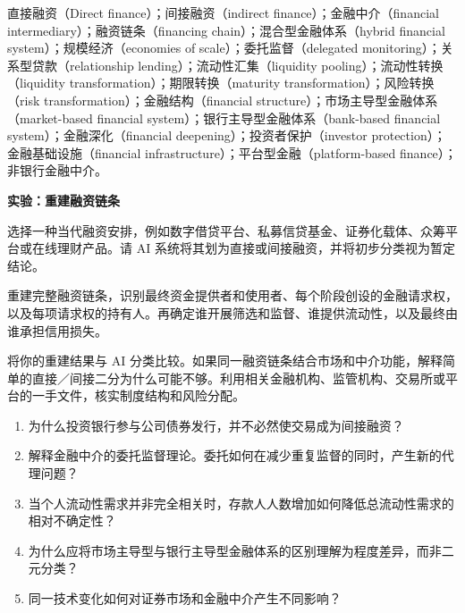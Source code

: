 

直接融资（Direct finance）；间接融资（indirect finance）；金融中介（financial intermediary）；融资链条（financing chain）；混合型金融体系（hybrid financial system）；规模经济（economies of scale）；委托监督（delegated monitoring）；关系型贷款（relationship lending）；流动性汇集（liquidity pooling）；流动性转换（liquidity transformation）；期限转换（maturity transformation）；风险转换（risk transformation）；金融结构（financial structure）；市场主导型金融体系（market-based financial system）；银行主导型金融体系（bank-based financial system）；金融深化（financial deepening）；投资者保护（investor protection）；金融基础设施（financial infrastructure）；平台型金融（platform-based finance）；非银行金融中介。




\textbf{实验：重建融资链条}

选择一种当代融资安排，例如数字借贷平台、私募信贷基金、证券化载体、众筹平台或在线理财产品。请 AI 系统将其划为直接或间接融资，并将初步分类视为暂定结论。

重建完整融资链条，识别最终资金提供者和使用者、每个阶段创设的金融请求权，以及每项请求权的持有人。再确定谁开展筛选和监督、谁提供流动性，以及最终由谁承担信用损失。

将你的重建结果与 AI 分类比较。如果同一融资链条结合市场和中介功能，解释简单的直接／间接二分为什么可能不够。利用相关金融机构、监管机构、交易所或平台的一手文件，核实制度结构和风险分配。



\begin{enumerate}

\item 为什么投资银行参与公司债券发行，并不必然使交易成为间接融资？

\item 解释金融中介的委托监督理论。委托如何在减少重复监督的同时，产生新的代理问题？

\item 当个人流动性需求并非完全相关时，存款人人数增加如何降低总流动性需求的相对不确定性？

\item 为什么应将市场主导型与银行主导型金融体系的区别理解为程度差异，而非二元分类？

\item 同一技术变化如何对证券市场和金融中介产生不同影响？

\end{enumerate}

